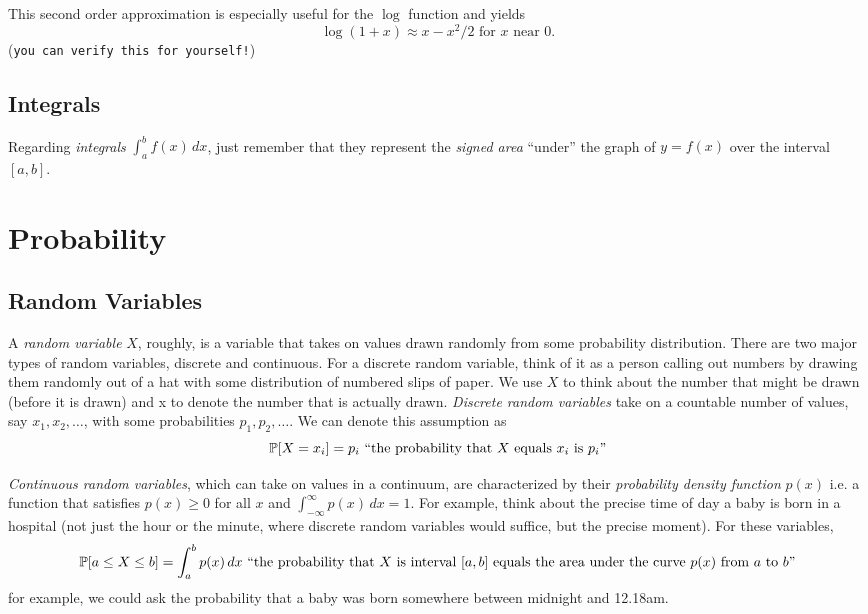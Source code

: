 This second order approximation is especially useful for the $\log$ function and yields
\begin{equation}
\log(1+x)\approx x-x^2/2 \mbox{ for $x$ near $0$}.
\end{equation}
(\texttt{you can verify this for yourself!})

\subsection{Integrals} Regarding  \emph{integrals} $\int_a^b f(x)\,dx$, just remember that
they represent the \emph{signed area} ``under'' the graph of $y=f(x)$
over the interval $[a,b]$. %

\section{Probability}

\subsection{Random Variables} A  \emph{random variable} $X$, roughly,
is a variable that takes on values drawn randomly from some
probability distribution.  There are two major types of random
variables, discrete and continuous.  For a discrete random variable, think of it as a person calling out numbers
by drawing them randomly out of a hat with some distribution of
numbered slips of paper. We use $X$ to think about the number that might be drawn (before it is drawn) and x to denote the number that is actually drawn.
\emph{Discrete random variables} take on a countable number of values, say $x_1,x_2,\dots$, with some probabilities $p_1,p_2,\dots$. We can denote this assumption as 
\[
\P[X=x_i]=p_i \mbox{ ``the probability that $X$ equals $x_i$ is $p_i$''}
\]

 \emph{Continuous random variables},  which can take on values in a continuum, are
 characterized by their  \emph{probability density function} $p(x)$
 i.e. a function that satisfies $p(x)\ge 0$ for all $x$ and
 $\int_{-\infty}^\infty p(x)\,dx =1$. For example, think about the
 precise time of day a baby
is born in a hospital (not just the hour or the minute, where discrete
random variables would suffice, but the
precise moment). For these variables, 
\[
\P[a\le X\le b] = \int_a^b p(x)\,dx \mbox{ ``the probability that $X$ is interval $[a,b]$ equals the area under the curve $p(x)$ from $a$ to $b$''}
\]
for example, we could ask the probability that a baby was born
somewhere between
midnight and 12.18am. 

